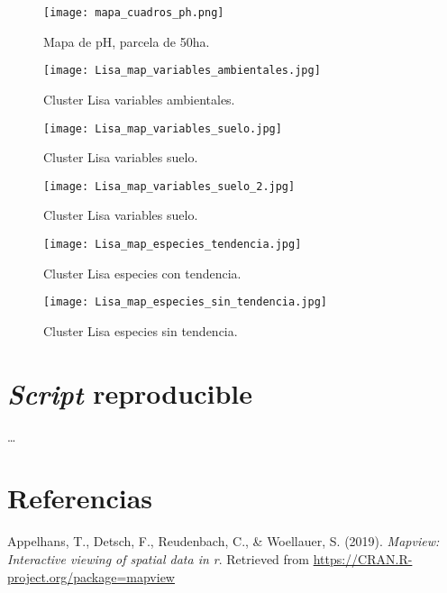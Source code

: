 \documentclass[11pt,]{article}
\begin{document}
\begin{figure}
\centering
\texttt{[image: mapa\_cuadros\_ph.png]}
\caption{Mapa de pH, parcela de 50ha. \label{fig:mapa_cuadros_pH}}
\end{figure}

\begin{figure}
\centering
\texttt{[image: Lisa\_map\_variables\_ambientales.jpg]}
\caption{Cluster Lisa variables ambientales.
\label{fig:Lisa_map_variables_ambientales}}
\end{figure}

\begin{figure}
\centering
\texttt{[image: Lisa\_map\_variables\_suelo.jpg]}
\caption{Cluster Lisa variables suelo.
\label{fig:Lisa_map_variables_suelo}}
\end{figure}

\begin{figure}
\centering
\texttt{[image: Lisa\_map\_variables\_suelo\_2.jpg]}
\caption{Cluster Lisa variables suelo.
\label{fig:Lisa_map_variables_suelo_2}}
\end{figure}

\begin{figure}
\centering
\texttt{[image: Lisa\_map\_especies\_tendencia.jpg]}
\caption{Cluster Lisa especies con tendencia.
\label{fig:Lisa_map_especies_tendencia}}
\end{figure}

\begin{figure}
\centering
\texttt{[image: Lisa\_map\_especies\_sin\_tendencia.jpg]}
\caption{Cluster Lisa especies sin tendencia.
\label{fig:Lisa_map_especies_sin_tendencia}}
\end{figure}

\section{\texorpdfstring{\emph{Script}
reproducible}{Script reproducible}}\label{script-reproducible}

\ldots

\section*{Referencias}\label{referencias}

\hypertarget{refs}{}
\hypertarget{ref-MapView}{}
Appelhans, T., Detsch, F., Reudenbach, C., \& Woellauer, S. (2019).
\emph{Mapview: Interactive viewing of spatial data in r}. Retrieved from
\url{https://CRAN.R-project.org/package=mapview}
\end{document}
